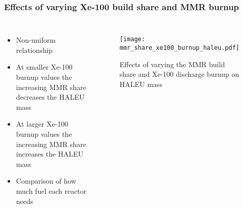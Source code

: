 \begin{frame}
    \frametitle{Effects of varying Xe-100 build share and MMR burnup}
    \begin{columns}

        \column[t]{4cm}
        \begin{itemize}
            \item Non-uniform relationship
            \item At smaller Xe-100 burnup values the increasing MMR 
                  share decreases the HALEU mass
            \item At larger Xe-100 burnup values the increasing MMR share 
                  increases the HALEU mass
            \item Comparison of how much fuel each reactor needs
        \end{itemize}

    \column[t]{6cm}
    \vspace{-1cm}
    \begin{figure}
        \centering 
            \texttt{[image: mmr\_share\_xe100\_burnup\_haleu.pdf]}
            \caption{Effects of varying the MMR build share and 
            Xe-100 discharge burnup on HALEU mass}
            \label{fig:mmr_share_xe100_bu}
    \end{figure}

\end{columns}
\end{frame}

